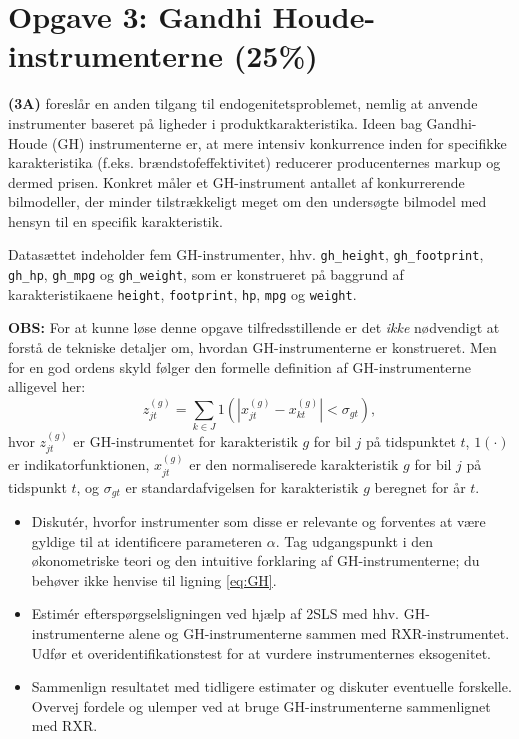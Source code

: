 \documentclass[a4paper,12pt]{article}
\begin{document}
\bigskip
\section*{Opgave 3: Gandhi Houde-instrumenterne (25\%)}

\noindent \textbf{(3A)} \cite{gandhi2019measuring} foreslår en anden tilgang til endogenitetsproblemet, nemlig at anvende instrumenter baseret på ligheder i produktkarakteristika. Ideen bag Gandhi-Houde (GH) instrumenterne er, at mere intensiv
konkurrence inden for specifikke karakteristika (f.eks. brændstofeffektivitet) reducerer producenternes markup og dermed prisen. Konkret måler et GH-instrument antallet af konkurrerende bilmodeller, der minder tilstrækkeligt meget om den undersøgte bilmodel med hensyn til en specifik karakteristik. 

Datasættet indeholder fem GH-instrumenter, hhv. \texttt{gh\_height}, \texttt{gh\_footprint}, \texttt{gh\_hp}, \texttt{gh\_mpg} og \texttt{gh\_weight}, som er konstrueret på baggrund af karakteristikaene \texttt{height}, \texttt{footprint}, \texttt{hp}, \texttt{mpg} og \texttt{weight}. 

 \textbf{OBS:} For at kunne løse denne opgave tilfredsstillende er det \textit{ikke} nødvendigt at forstå de tekniske detaljer om, hvordan GH-instrumenterne er konstrueret. Men for en god ordens skyld følger den formelle definition af GH-instrumenterne alligevel her:
\begin{equation}
    z_{jt}^{(g)} = \sum_{k \in J} 1\left(|x_{jt}^{(g)} - x_{kt}^{(g)}| < \sigma_{gt}\right),\label{eq:GH}
\end{equation}
hvor $z^{(g)}_{jt}$ er GH-instrumentet for karakteristik $g$ for bil $j$ på tidspunktet $t$, $1(\cdot)$ er indikatorfunktionen, \( x_{jt}^{(g)} \) er den normaliserede karakteristik $g$ for bil \( j \) på tidspunkt \( t \), og \( \sigma_{gt} \) er standardafvigelsen for   karakteristik $g$ beregnet for år \( t \).

\begin{itemize}
    \item Diskutér, hvorfor instrumenter som disse er relevante og forventes at være gyldige til at identificere parameteren \(\alpha\). Tag udgangspunkt i den økonometriske teori og den intuitive forklaring af GH-instrumenterne; du behøver ikke henvise til ligning \eqref{eq:GH}.
    \item Estimér efterspørgselsligningen ved hjælp af 2SLS med hhv. GH-instrumenterne alene og GH-instrumenterne sammen med RXR-instrumentet. Udfør et overidentifikationstest for at vurdere instrumenternes eksogenitet.
    \item Sammenlign resultatet med tidligere estimater og diskuter eventuelle forskelle. Overvej fordele og ulemper ved at bruge GH-instrumenterne sammenlignet med RXR.
\end{itemize} 
 \bigskip 
\end{document}
